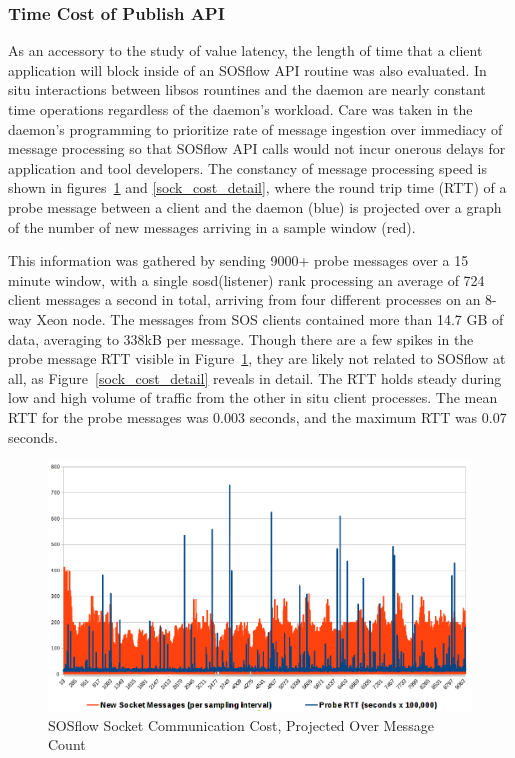 \subsubsection{Time Cost of Publish API} %
%
As an accessory to the study of value latency, the length of time that
a client application will block inside of an SOSflow API routine was
also evaluated.
%
In situ interactions between libsos rountines and the daemon are
nearly constant time operations regardless of the daemon's workload.
%
Care was taken in the daemon's programming to prioritize rate of message
ingestion over immediacy of message processing so that SOSflow API calls
would not incur onerous delays for application and tool developers.
%
The constancy of message processing speed is shown in
figures~\ref{sock_cost} and \ref{sock_cost_detail}, where the round
trip time (RTT) of a probe message between a client and the daemon
(blue) is projected over a graph of the number of new messages
arriving in a sample window (red).
%
\par
%
This information was gathered by sending 9000+ probe messages over a 15
minute window, with a single sosd(listener) rank processing an average
of 724 client messages a second in total, arriving from four different
processes on an 8-way Xeon node.
%
The messages from SOS clients contained more than 14.7 GB of data,
averaging to 338kB per message.
%
Though there are a few spikes in the probe message RTT visible in
Figure~\ref{sock_cost}, they are likely not related to SOSflow at all,
as Figure~\ref{sock_cost_detail} reveals in detail.
%
The RTT holds steady during low and high volume of traffic from the
other in situ client processes.
%
The mean RTT for the probe messages was 0.003 seconds, and the maximum
RTT was 0.07 seconds.
%
\begin{figure}[h]
\centering
\includegraphics[width=\columnwidth]{images/icebox_api_cost_when_slam.png}
\caption{SOSflow Socket Communication Cost, Projected Over Message Count}
\label{sock_cost}
\end{figure}

